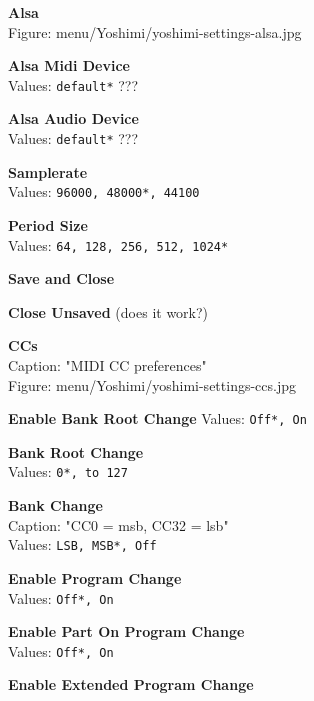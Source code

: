 \documentclass[
 11pt,
 twoside,
 a4paper,
 headinclude,
 footinclude,
 final                                 %
]{article}
\begin{document}
\begin{enumber}
\begin{enumber}
\begin{enumber}
\begin{enumber}
\begin{enumber}
            \end{enumber}
            \item \textbf{Alsa} \\
               Figure: menu/Yoshimi/yoshimi-settings-alsa.jpg
            \begin{enumber}
               \item \textbf{Alsa Midi Device} \\
                  Values: \texttt{default*} ???
               \item \textbf{Alsa Audio Device} \\
                  Values: \texttt{default*} ???
               \item \textbf{Samplerate} \\
                  Values: \texttt{96000, 48000*, 44100}
               \item \textbf{Period Size} \\
                  Values: \texttt{64, 128, 256, 512, 1024*}
               \item \textbf{Save and Close}
               \item \textbf{Close Unsaved} (does it work?)
            \end{enumber}
            \item \textbf{CCs} \\
               Caption: "MIDI CC preferences" \\
               Figure: menu/Yoshimi/yoshimi-settings-ccs.jpg
            \begin{enumber}
               \item \textbf{Enable Bank Root Change}
                  Values: \texttt{Off*, On}
               \item \textbf{Bank Root Change} \\
                  Values: \texttt{0*, to 127}
               \item \textbf{Bank Change} \\
                  Caption: "CC0 = msb, CC32 = lsb" \\
                  Values: \texttt{LSB, MSB*, Off}
               \item \textbf{Enable Program Change} \\
                  Values: \texttt{Off*, On}
               \item \textbf{Enable Part On Program Change} \\
                  Values: \texttt{Off*, On}
               \item \textbf{Enable Extended Program Change} \\

\end{enumber}
\end{enumber}
\end{enumber}
\end{enumber}
\end{enumber}
\end{document}
